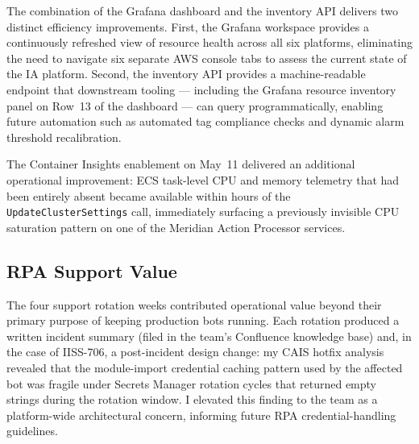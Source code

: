 The combination of the Grafana dashboard and the inventory API delivers two
distinct efficiency improvements. First, the Grafana workspace provides a
continuously refreshed view of resource health across all six platforms, eliminating the need to navigate six separate AWS console tabs
to assess the current state of the IA platform. Second, the inventory API
provides a machine-readable endpoint that downstream tooling --- including the
Grafana resource inventory panel on Row~13 of the dashboard --- can query
programmatically, enabling future automation such as automated tag compliance
checks and dynamic alarm threshold recalibration.

The Container Insights enablement on May~11 delivered an additional operational
improvement: ECS task-level CPU and memory telemetry that had been entirely
absent became available within hours of the \texttt{UpdateClusterSettings}
call, immediately surfacing a previously invisible CPU saturation pattern on
one of the Meridian Action Processor services.

\subsection{RPA Support Value}

The four support rotation weeks contributed operational value beyond their
primary purpose of keeping production bots running. Each rotation produced
a written incident summary (filed in the team's Confluence knowledge base)
and, in the case of IISS-706, a post-incident design change: my CAIS
hotfix analysis revealed that the module-import credential caching pattern
used by the affected bot was fragile under Secrets Manager rotation cycles
that returned empty strings during the rotation window. I elevated this finding
to the team as a platform-wide architectural concern, informing
future RPA credential-handling guidelines.
